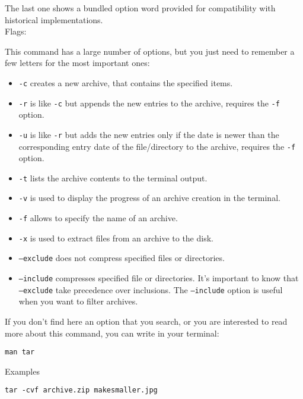 \documentclass[hidelinks,12pt,a4paper,numbers=enddot]{scrartcl}
\begin{document}
The last one shows a bundled option word provided for compatibility with
historical implementations.\\

Flags:

This command has a large number of options, but you just need to remember a
few letters for the most important ones:

\begin{itemize}
    \item \texttt{-c} creates a new archive, that contains the specified items.
    \item \texttt{-r} is like \texttt{-c} but appends the new entries to the
        archive, requires the \texttt{-f} option.
    
    \item \texttt{-u} is like \texttt{-r} but adds the new entries only if
        the date is newer than the corresponding entry date of the file/directory to
        the archive, requires the \texttt{-f} option.
    
    \item \texttt{-t} lists the archive contents to the terminal output.
    \item \texttt{-v} is used to display the progress of an archive creation in
        the terminal.
    
    \item \texttt{-f} allows to specify the name of an archive.
    \item \texttt{-x} is used to extract files from an archive to the disk.
    \item \texttt{--exclude} does not compress specified files or directories.
    \item \texttt{--include} compresses specified file or directories. It's
        important to know that \texttt{--exclude} take precedence over inclusions.
        The \texttt{--include} option is useful when you want to filter archives.
    
\end{itemize}

If you don't find here an option that you search, or you are interested to read
more about this command, you can write in your terminal:

\begin{verbatim}
man tar
\end{verbatim}

Examples

\begin{verbatim}
tar -cvf archive.zip makesmaller.jpg
\end{verbatim}
\end{document}
